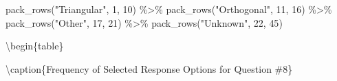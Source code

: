 \documentclass[
  letterpaper,
  DIV=11,
  numbers=noendperiod]{scrreprt}
\newenvironment{Shaded}{\begin{snugshade}}{\end{snugshade}}
\newcommand{\DecValTok}[1]{\textcolor[rgb]{0.68,0.00,0.00}{#1}}
\newcommand{\FunctionTok}[1]{\textcolor[rgb]{0.28,0.35,0.67}{#1}}
\newcommand{\NormalTok}[1]{\textcolor[rgb]{0.00,0.23,0.31}{#1}}
\newcommand{\SpecialCharTok}[1]{\textcolor[rgb]{0.37,0.37,0.37}{#1}}
\newcommand{\StringTok}[1]{\textcolor[rgb]{0.13,0.47,0.30}{#1}}
\begin{document}
\begin{Shaded}
\begin{Highlighting}[]
  \FunctionTok{pack\_rows}\NormalTok{(}\StringTok{"Triangular"}\NormalTok{, }\DecValTok{1}\NormalTok{, }\DecValTok{10}\NormalTok{) }\SpecialCharTok{\%\textgreater{}\%}
  \FunctionTok{pack\_rows}\NormalTok{(}\StringTok{"Orthogonal"}\NormalTok{, }\DecValTok{11}\NormalTok{, }\DecValTok{16}\NormalTok{) }\SpecialCharTok{\%\textgreater{}\%}
  \FunctionTok{pack\_rows}\NormalTok{(}\StringTok{"Other"}\NormalTok{, }\DecValTok{17}\NormalTok{, }\DecValTok{21}\NormalTok{) }\SpecialCharTok{\%\textgreater{}\%}
  \FunctionTok{pack\_rows}\NormalTok{(}\StringTok{"Unknown"}\NormalTok{, }\DecValTok{22}\NormalTok{, }\DecValTok{45}\NormalTok{)}
\end{Highlighting}
\end{Shaded}

\textbackslash begin\{table\}

\textbackslash caption\{\label{tab:Q8-RESPONSES}Frequency of Selected
Response Options for Question \#8\} \centering
\end{document}
